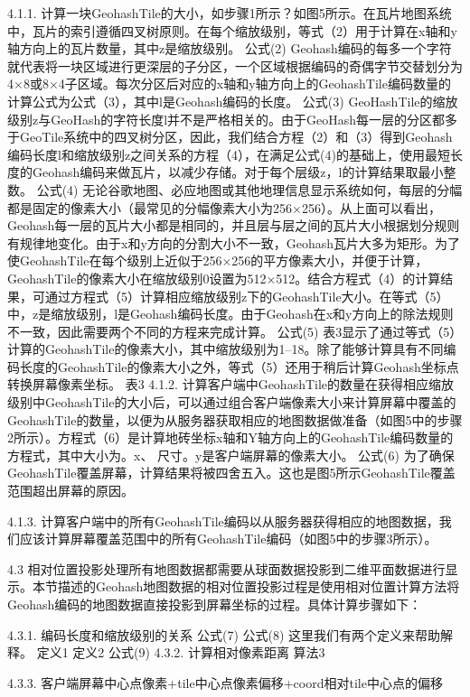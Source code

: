 4.1.1. 计算一块GeohashTile的大小，如步骤1所示？如图5所示。在瓦片地图系统中，瓦片的索引遵循四叉树原则。在每个缩放级别，等式（2）用于计算在x轴和y轴方向上的瓦片数量，其中z是缩放级别。
公式(2)
Geohash编码的每多一个字符就代表将一块区域进行更深层的子分区，一个区域根据编码的奇偶字节交替划分为4×8或8×4子区域。每次分区后对应的x轴和y轴方向上的GeohashTile编码数量的计算公式为公式（3），其中l是Geohash编码的长度。 
公式(3)
GeoHashTile的缩放级别z与GeoHash的字符长度l并不是严格相关的。由于GeoHash每一层的分区都多于GeoTile系统中的四叉树分区，因此，我们结合方程（2）和（3）得到Geohash编码长度l和缩放级别z之间关系的方程（4），在满足公式(4)的基础上，使用最短长度的Geohash编码来做瓦片，以减少存储。对于每个层级z，l的计算结果取最小整数。
公式(4)
无论谷歌地图、必应地图或其他地理信息显示系统如何，每层的分幅都是固定的像素大小（最常见的分幅像素大小为256×256）。从上面可以看出，Geohash每一层的瓦片大小都是相同的，并且层与层之间的瓦片大小根据划分规则有规律地变化。由于x和y方向的分割大小不一致，Geohash瓦片大多为矩形。为了使GeohashTile在每个级别上近似于256×256的平方像素大小，并便于计算，GeohashTile的像素大小在缩放级别0设置为512×512。结合方程式（4）的计算结果，可通过方程式（5）计算相应缩放级别z下的GeohashTile大小。在等式（5）中，z是缩放级别，l是Geohash编码长度。由于Geohash在x和y方向上的除法规则不一致，因此需要两个不同的方程来完成计算。 
公式(5)
表3显示了通过等式（5）计算的GeohashTile的像素大小，其中缩放级别为1–18。除了能够计算具有不同编码长度的GeohashTile的像素大小之外，等式（5）还用于稍后计算Geohash坐标点转换屏幕像素坐标。
表3
4.1.2. 计算客户端中GeohashTile的数量在获得相应缩放级别中GeohashTile的大小后，可以通过组合客户端像素大小来计算屏幕中覆盖的GeohashTile的数量，以便为从服务器获取相应的地图数据做准备（如图5中的步骤2所示）。方程式（6）是计算地砖坐标x轴和Y轴方向上的GeohashTile编码数量的方程式，其中大小为。x、 尺寸。y是客户端屏幕的像素大小。
公式(6)
为了确保GeohashTile覆盖屏幕，计算结果将被四舍五入。这也是图5所示GeohashTile覆盖范围超出屏幕的原因。

4.1.3. 计算客户端中的所有GeohashTile编码以从服务器获得相应的地图数据，我们应该计算屏幕覆盖范围中的所有GeohashTile编码（如图5中的步骤3所示）。

4.3 相对位置投影处理所有地图数据都需要从球面数据投影到二维平面数据进行显示。本节描述的Geohash地图数据的相对位置投影过程是使用相对位置计算方法将Geohash编码的地图数据直接投影到屏幕坐标的过程。具体计算步骤如下：

4.3.1. 编码长度和缩放级别的关系
公式(7)
公式(8)
这里我们有两个定义来帮助解释。
定义1
定义2
公式(9)
4.3.2. 计算相对像素距离
算法3

4.3.3. 客户端屏幕中心点像素+tile中心点像素偏移+coord相对tile中心点的偏移

